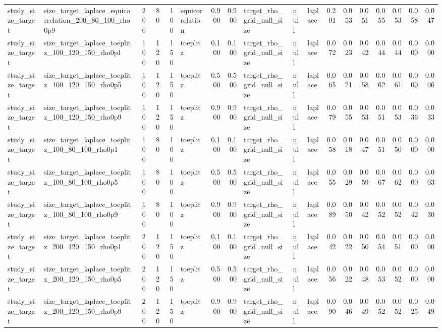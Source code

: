 \begin{tabular}{llrrrlrrlllrrrrrrr}
study\_size\_target & size\_target\_laplace\_equicorrelation\_200\_80\_100\_rho0p9 & 200 & 80 & 100 & equicorrelation & 0.900 & 0.900 & target\_rho\_grid\_null\_size & null & laplace & 0.201 & 0.053 & 0.051 & 0.055 & 0.053 & 0.058 & 0.047 \\
study\_size\_target & size\_target\_laplace\_toeplitz\_100\_120\_150\_rho0p1 & 100 & 120 & 150 & toeplitz & 0.100 & 0.100 & target\_rho\_grid\_null\_size & null & laplace & 0.072 & 0.023 & 0.042 & 0.044 & 0.044 & 0.000 & 0.000 \\
study\_size\_target & size\_target\_laplace\_toeplitz\_100\_120\_150\_rho0p5 & 100 & 120 & 150 & toeplitz & 0.500 & 0.500 & target\_rho\_grid\_null\_size & null & laplace & 0.065 & 0.021 & 0.058 & 0.062 & 0.061 & 0.000 & 0.006 \\
study\_size\_target & size\_target\_laplace\_toeplitz\_100\_120\_150\_rho0p9 & 100 & 120 & 150 & toeplitz & 0.900 & 0.900 & target\_rho\_grid\_null\_size & null & laplace & 0.079 & 0.055 & 0.053 & 0.051 & 0.053 & 0.036 & 0.033 \\
study\_size\_target & size\_target\_laplace\_toeplitz\_100\_80\_100\_rho0p1 & 100 & 80 & 100 & toeplitz & 0.100 & 0.100 & target\_rho\_grid\_null\_size & null & laplace & 0.058 & 0.018 & 0.047 & 0.051 & 0.050 & 0.000 & 0.000 \\
study\_size\_target & size\_target\_laplace\_toeplitz\_100\_80\_100\_rho0p5 & 100 & 80 & 100 & toeplitz & 0.500 & 0.500 & target\_rho\_grid\_null\_size & null & laplace & 0.055 & 0.029 & 0.059 & 0.067 & 0.062 & 0.000 & 0.003 \\
study\_size\_target & size\_target\_laplace\_toeplitz\_100\_80\_100\_rho0p9 & 100 & 80 & 100 & toeplitz & 0.900 & 0.900 & target\_rho\_grid\_null\_size & null & laplace & 0.089 & 0.050 & 0.042 & 0.052 & 0.052 & 0.042 & 0.030 \\
study\_size\_target & size\_target\_laplace\_toeplitz\_200\_120\_150\_rho0p1 & 200 & 120 & 150 & toeplitz & 0.100 & 0.100 & target\_rho\_grid\_null\_size & null & laplace & 0.042 & 0.022 & 0.050 & 0.054 & 0.051 & 0.000 & 0.000 \\
study\_size\_target & size\_target\_laplace\_toeplitz\_200\_120\_150\_rho0p5 & 200 & 120 & 150 & toeplitz & 0.500 & 0.500 & target\_rho\_grid\_null\_size & null & laplace & 0.056 & 0.022 & 0.048 & 0.053 & 0.052 & 0.000 & 0.000 \\
study\_size\_target & size\_target\_laplace\_toeplitz\_200\_120\_150\_rho0p9 & 200 & 120 & 150 & toeplitz & 0.900 & 0.900 & target\_rho\_grid\_null\_size & null & laplace & 0.090 & 0.046 & 0.049 & 0.052 & 0.052 & 0.025 & 0.049 \\

\end{tabular}

